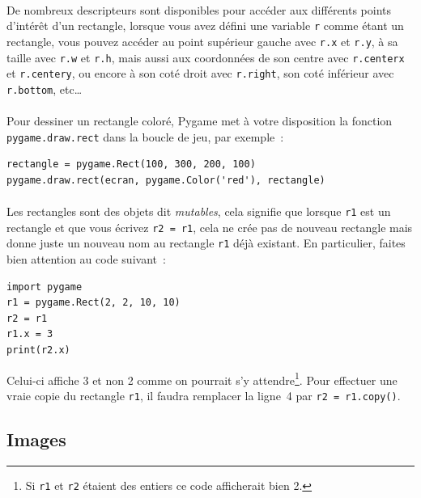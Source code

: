 \paragraph{}
De nombreux descripteurs sont disponibles pour accéder aux différents points d'intérêt d'un rectangle, lorsque vous avez défini une variable \texttt{r} comme étant un rectangle, vous pouvez accéder au point supérieur gauche avec \texttt{r.x} et \texttt{r.y}, à sa taille avec \texttt{r.w} et \texttt{r.h}, mais aussi aux coordonnées de son centre avec \texttt{r.centerx} et \texttt{r.centery}, ou encore à son coté droit avec \texttt{r.right}, son coté inférieur avec \texttt{r.bottom}, etc…

\paragraph{}
Pour dessiner un rectangle coloré, Pygame met à votre disposition la fonction \texttt{pygame.draw.rect} dans la boucle de jeu, par exemple~:
\begin{verbatim}
rectangle = pygame.Rect(100, 300, 200, 100)
pygame.draw.rect(ecran, pygame.Color('red'), rectangle)
\end{verbatim}

\paragraph{}
Les rectangles sont des objets dit \emph{mutables}, cela signifie que lorsque \texttt{r1} est un rectangle et que vous écrivez \texttt{r2 = r1}, cela ne crée pas de nouveau rectangle mais donne juste un nouveau nom au rectangle \texttt{r1} déjà existant.
En particulier, faites bien attention au code suivant~:
\begin{verbatim}
import pygame
r1 = pygame.Rect(2, 2, 10, 10)
r2 = r1
r1.x = 3
print(r2.x)
\end{verbatim}
Celui-ci affiche 3 et non 2 comme on pourrait s'y attendre\footnote{Si \texttt{r1} et \texttt{r2} étaient des entiers ce code afficherait bien 2.}.
Pour effectuer une vraie copie du rectangle \texttt{r1}, il faudra remplacer la ligne~4 par \texttt{r2 = r1.copy()}.

\subsection{Images}
\label{sec:images}


